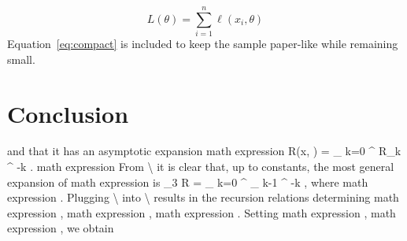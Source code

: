 \documentclass[11pt]{article}
\begin{document}
\begin{equation}
\label{eq:compact}
L(\theta) = \sum_{i=1}^{n} \ell(x_i, \theta)
\end{equation}
Equation~\ref{eq:compact} is included to keep the sample paper-like while remaining small.

\section{Conclusion}

and that it has an asymptotic expansion math expression R(x, ) = \_ k=0 \textasciicircum{} R\_k \textasciicircum{} -k . math expression From \textbackslash{} it is clear that, up to constants, the most general expansion of math expression is \_3 R = \_ k=0 \textasciicircum{} \_ k-1 \textasciicircum{} -k , where math expression . Plugging \textbackslash{} into \textbackslash{} results in the recursion relations determining math expression , math expression , math expression . Setting math expression , math expression , we obtain
\end{document}
